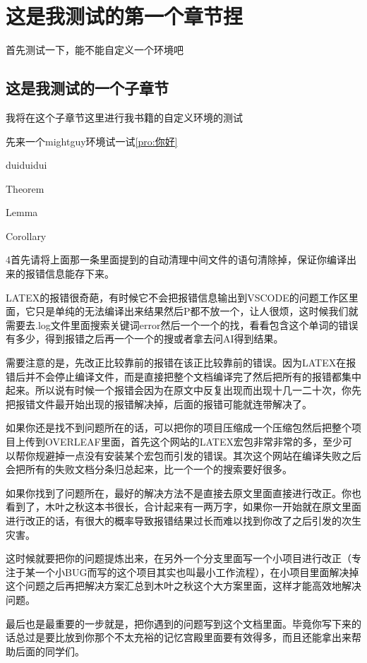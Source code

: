 \documentclass[lang=cn,10pt]{elegantbook}
\begin{document}
\tableofcontents

\chapter{这是我测试的第一个章节捏}
首先测试一下，能不能自定义一个环境吧~

\section{这是我测试的一个子章节}

我将在这个子章节这里进行我书籍的自定义环境的测试

先来一个mightguy环境试一试\ref{pro:你好}

\begin{proposition}\label{pro:你好}
    duiduidui
\end{proposition}

\begin{theorem}
    Theorem
\end{theorem}

\begin{lemma}
    Lemma
\end{lemma}

\begin{corollary}
    Corollary
\end{corollary}
\begin{mightguy}
    4首先请将上面那一条里面提到的自动清理中间文件的语句清除掉，保证你编译出来的报错信息能存下来。

    LATEX的报错很奇葩，有时候它不会把报错信息输出到VSCODE的问题工作区里面，它只是单纯的无法编译出来结果然后P都不放一个，让人很烦，这时候我们就需要去.log文件里面搜索关键词error然后一个一个的找，看看包含这个单词的错误有多少，得到报错之后再一个一个的搜或者拿去问AI得到结果。

    需要注意的是，先改正比较靠前的报错在该正比较靠前的错误。因为LATEX在报错后并不会停止编译文件，而是直接把整个文档编译完了然后把所有的报错都集中起来。所以说有时候一个报错会因为在原文中反复出现而出现十几一二十次，你先把报错文件最开始出现的报错解决掉，后面的报错可能就连带解决了。

    如果你还是找不到问题所在的话，可以把你的项目压缩成一个压缩包然后把整个项目上传到OVERLEAF里面，首先这个网站的LATEX宏包非常非常的多，至少可以帮你规避掉一点没有安装某个宏包而引发的错误。其次这个网站在编译失败之后会把所有的失败文档分条归总起来，比一个一个的搜索要好很多。

    如果你找到了问题所在，最好的解决方法不是直接去原文里面直接进行改正。你也看到了，木叶之秋这本书很长，合计起来有一两万字，如果你一开始就在原文里面进行改正的话，有很大的概率导致报错结果过长而难以找到你改了之后引发的次生灾害。

    这时候就要把你的问题提炼出来，在另外一个分支里面写一个小项目进行改正（专注于某一个小BUG而写的这个项目其实也叫最小工作流程），在小项目里面解决掉这个问题之后再把解决方案汇总到木叶之秋这个大方案里面，这样才能高效地解决问题。

    最后也是最重要的一步就是，把你遇到的问题写到这个文档里面。毕竟你写下来的话总过是要比放到你那个不太充裕的记忆宫殿里面要有效得多，而且还能拿出来帮助后面的同学们。
\end{mightguy}
\end{document}
